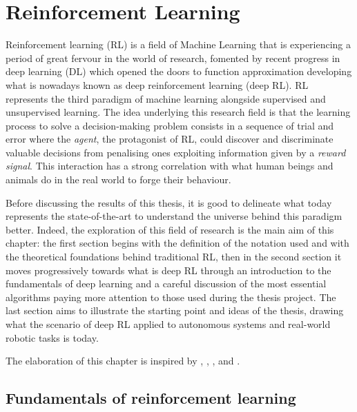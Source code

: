 \chapter{Reinforcement Learning} \label{ch:ch2}

Reinforcement learning (RL) is a field of Machine Learning that is experiencing a period of great fervour in the world of research, fomented by recent progress in deep learning (DL) which opened the doors to function approximation developing what is nowadays known as deep reinforcement learning (deep RL).
RL represents the third paradigm of machine learning alongside supervised and unsupervised learning. The idea underlying this research field is that the learning process to solve a decision-making problem consists in a sequence of trial and error where the \textit{agent}, the protagonist of RL, could discover and discriminate valuable decisions from penalising ones exploiting information given by a \textit{reward signal}. This interaction has a strong correlation with what human beings and animals do in the real world to forge their behaviour.

Before discussing the results of this thesis, it is good to delineate what today represents the state-of-the-art to understand the universe behind this paradigm better. Indeed, the exploration of this field of research is the main aim of this chapter: the first section begins with the definition of the notation used and with the theoretical foundations behind traditional RL, then in the second section it moves progressively towards what is deep RL through an introduction to the fundamentals of deep learning and a careful discussion of the most essential algorithms paying more attention to those used during the thesis project.
The last section aims to illustrate the starting point and ideas of the thesis, drawing what the scenario of deep RL applied to autonomous systems and real-world robotic tasks is today.


The elaboration of this chapter is inspired by \cite{silver2015lectures}, \cite{sutton2018reinforcement}, \cite{openai2018spinningup}, \cite{lapan2018deep} and \cite{franccois2018introduction}.

\section{Fundamentals of reinforcement learning} \label{fundreinflearn}


